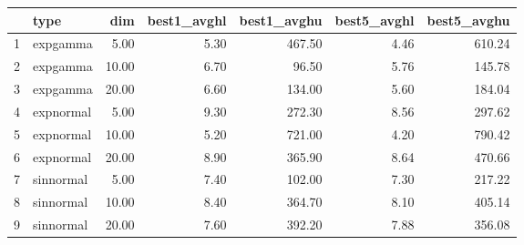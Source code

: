 \begin{table}[ht]
\centering
\begin{tabular}{rlrrrrr}
  \hline
 & type & dim & best1\_avghl & best1\_avghu & best5\_avghl & best5\_avghu \\ 
  \hline
1 & expgamma & 5.00 & 5.30 & 467.50 & 4.46 & 610.24 \\ 
  2 & expgamma & 10.00 & 6.70 & 96.50 & 5.76 & 145.78 \\ 
  3 & expgamma & 20.00 & 6.60 & 134.00 & 5.60 & 184.04 \\ 
  4 & expnormal & 5.00 & 9.30 & 272.30 & 8.56 & 297.62 \\ 
  5 & expnormal & 10.00 & 5.20 & 721.00 & 4.20 & 790.42 \\ 
  6 & expnormal & 20.00 & 8.90 & 365.90 & 8.64 & 470.66 \\ 
  7 & sinnormal & 5.00 & 7.40 & 102.00 & 7.30 & 217.22 \\ 
  8 & sinnormal & 10.00 & 8.40 & 364.70 & 8.10 & 405.14 \\ 
  9 & sinnormal & 20.00 & 7.60 & 392.20 & 7.88 & 356.08 \\ 
   \hline
\end{tabular}
\end{table}
